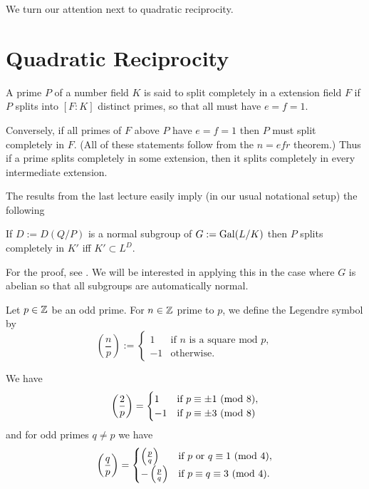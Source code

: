 \documentclass[10pt,a4paper]{amsart}
\begin{document}
We turn our attention next to quadratic reciprocity.


\section{Quadratic Reciprocity}

\renewcommand{\O}{\ensuremath{\mathcal{O}}}

\begin{defn}
A prime $P$ of a number field $K$ is said to split completely in a extension
field $F$ if $P$ splits into $[F:K]$ distinct primes, so that all must have
$e=f=1$.
\end{defn}

Conversely, if all primes of $F$ above $P$ have $e=f=1$ then $P$ must split
completely in $F$. (All of these statements follow from the $n=efr$ theorem.)
Thus if a prime splits completely in some extension, then it splits completely
in every intermediate extension.

The results from the last lecture easily imply (in our usual notational setup)
the following

\begin{cor}\label{split}
If $D := D(Q/P)$ is a normal subgroup of $G := \mathrm{Gal}(L/K)$ then $P$ splits
completely in $K'$ iff $K' \subset L^D$.
\end{cor}

For the proof, see \cite[p.~105]{M}. We will be interested in applying this in
the case where $G$ is abelian so that all subgroups are automatically normal.

\begin{defn}
Let $p\in \mathbb{Z}$ be an odd prime. For $n\in\mathbb{Z}$ prime to $p$, we define the
Legendre symbol by
\[\left( \frac{n}{p} \right) :=
\begin{cases}
  1 & \text{if } n \text{ is a square mod } p, \\
  -1 & \text{otherwise.}
\end{cases} \]
\end{defn}


\begin{thm} We have
    \[
    \left( \frac{2}{p} \right) =
    \begin{cases}
        1 & \text{if } p \equiv \pm 1 \text{ } (\mathrm{mod}\text{ } 8), \\
        -1 & \text{if } p \equiv \pm 3 \text{ } (\mathrm{mod}\text{ } 8) \\
    \end{cases}
    \] and for odd primes $q\neq p$ we have
    \[
    \left( \frac{q}{p} \right) =
    \begin{cases}
        \left( \frac{p}{q} \right) & \text{if } p \text{ or } q \equiv 1 \text{ } (\mathrm{mod}\text{ } 4), \\
        -\left( \frac{p}{q} \right) & \text{if } p \equiv q \equiv 3 \text{ } (\mathrm{mod}\text{ } 4).
    \end{cases}
    \]
\end{thm}
\end{document}
